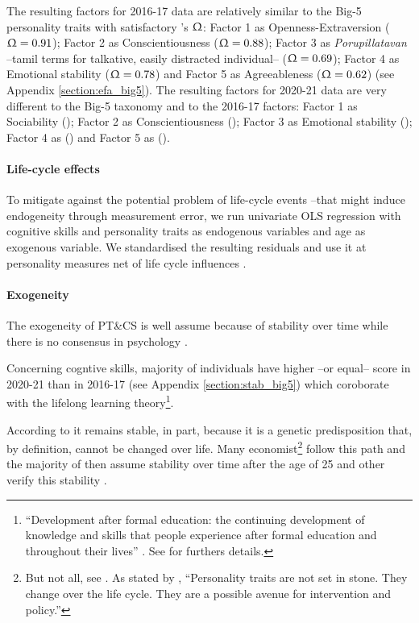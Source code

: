 \documentclass[a4paper, 11pt, onecolumn]{article}
\begin{document}
The resulting factors for 2016-17 data are relatively similar to the Big-5 personality traits with satisfactory \citeauthor{McDonald1999}'s $\Upomega$: Factor 1 as Openness-Extraversion ($\Upomega=0.91$); Factor 2 as Conscientiousness ($\Upomega=0.88$); Factor 3 as \textit{Porupillatavan} --tamil terms for talkative, easily distracted individual-- ($\Upomega=0.69$); Factor 4 as Emotional stability ($\Upomega=0.78$) and Factor 5 as Agreeableness ($\Upomega=0.62$) (see Appendix \ref{section:efa_big5}).
The resulting factors for 2020-21 data are very different to the Big-5 taxonomy and to the 2016-17 factors: Factor 1 as Sociability (); Factor 2 as Conscientiousness (); Factor 3 as Emotional stability (); Factor 4 as () and Factor 5 as ().

\paragraph{Life-cycle effects}
To mitigate against the potential problem of life-cycle events --that might induce endogeneity through measurement error, we run univariate OLS regression with cognitive skills and personality traits as endogenous variables and age as exogenous variable. %
We standardised the resulting residuals and use it at personality measures net of life cycle influences \citep{Nyhus2005, Brown2014}. 

\paragraph{Exogeneity}
The exogeneity of PT\&CS is well assume because of stability over time while there is no consensus in psychology \citep{Ardelt2000, Deary2014}.

Concerning cogntive skills, majority of individuals have higher --or equal-- score in 2020-21 than in 2016-17 (see Appendix \ref{section:stab_big5}) which coroborate with the lifelong learning theory\footnote{``Development after formal education: the continuing development of knowledge and skills that people experience after formal education and throughout their lives'' \citep{London2011}. See \cite{London2011} for furthers details.}. 
\cite{Raven2000}

\cite{Nisbett2012}

According to \cite{Costa1997, McCrae2000} it remains stable, in part, because it is a genetic predisposition that, by definition, cannot be changed over life.
Many economist\footnote{But not all, see \cite{Borghans2008, Almlund2011, Heckman2011}. As stated by \cite{Heckman2011}, ``Personality traits are not set in stone. They change over the life cycle. They are a possible avenue for intervention and policy.''} follow this path and the majority of then assume stability over time after the age of 25 and other verify this stability \citep{CobbClark2011}.
\end{document}
